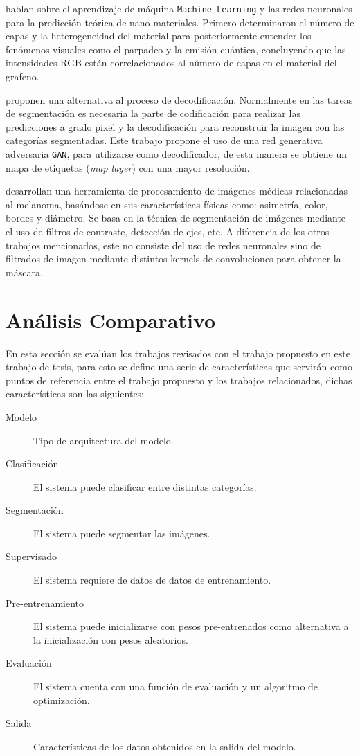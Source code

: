 \citet{zhou2019emerging} hablan sobre el aprendizaje de máquina \texttt{Machine Learning} y las redes neuronales para la predicción teórica de nano-materiales. Primero determinaron el número de capas y la heterogeneidad del material para posteriormente entender los fenómenos visuales como el parpadeo y la emisión cuántica, concluyendo que las intensidades RGB están correlacionados al número de capas en el material del grafeno. 

\citet{DBLP:journals/corr/LucCCV16} proponen una alternativa al proceso de decodificación. Normalmente en las tareas de segmentación es necesaria la parte de codificación para realizar las predicciones a grado pixel y la decodificación para reconstruir la imagen con las categorías segmentadas. Este trabajo propone el uso de una red generativa adversaria \texttt{GAN}, para utilizarse como decodificador, de esta manera se obtiene un mapa de etiquetas (\emph{map layer}) con una mayor resolución.

\citet{JAIN2015735} desarrollan una herramienta de procesamiento de imágenes médicas relacionadas al melanoma, basándose en sus características físicas como: asimetría, color, bordes y diámetro. Se basa en la técnica de segmentación de imágenes mediante el uso de filtros de contraste, detección de ejes, etc. A diferencia de los otros trabajos mencionados, este no consiste del uso de redes neuronales sino de filtrados de imagen mediante distintos kernels de convoluciones para obtener la máscara.

\section{Análisis Comparativo}
En esta sección se evalúan los trabajos revisados con el trabajo propuesto en este trabajo de tesis, para esto se define una serie de características que servirán como puntos de referencia entre el trabajo propuesto y los trabajos relacionados, dichas características son las siguientes:

\begin{description}
    \item[Modelo]{Tipo de arquitectura del modelo.}
    \item[Clasificación]{El sistema puede clasificar entre distintas categorías.}
    \item[Segmentación]{El sistema puede segmentar las imágenes.}
    \item[Supervisado]{ El sistema requiere de datos de datos de entrenamiento.}
    \item[Pre-entrenamiento]{El sistema puede inicializarse con pesos pre-entrenados como alternativa a la inicialización con pesos aleatorios.}
    \item[Evaluación]{El sistema cuenta con una función de evaluación y un algoritmo de optimización.}
    \item[Salida]{Características de los datos obtenidos en la salida del modelo.}
\end{description}

